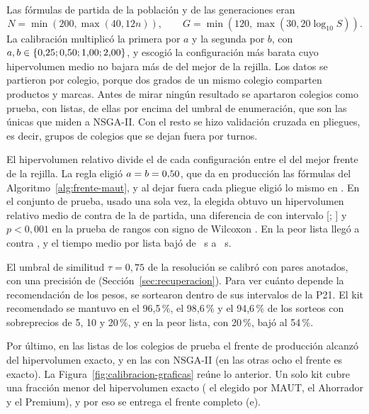 Las fórmulas de partida de la población y de las generaciones eran
\[N=\min(200,\max(40,12n)),\qquad G=\min(120,\max(30,20\log_{10}S)).\] La calibración multiplicó la primera por $a$ y la segunda por
$b$, con $a,b\in\{0{,}25; 0{,}50; 1{,}00; 2{,}00\}$, y escogió la configuración más barata cuyo hipervolumen medio no
bajara más de \calUmbralHV{} del mejor de la rejilla. Los datos se partieron por colegio, porque dos grados
de un mismo colegio comparten productos y marcas. Antes de mirar ningún resultado se apartaron \calColegiosPrueba{} colegios como prueba, con
\calHVListas{} listas, \calPrueba{} de ellas por encima del umbral de enumeración, que son las únicas que
miden a NSGA-II. Con el resto se hizo validación cruzada en \calPliegues{} pliegues, es decir,
\calPliegues{} grupos de colegios que se dejan fuera por turnos.

El hipervolumen relativo divide el de cada configuración entre el del mejor frente de la rejilla. La regla eligió $a=b=0{,}50$,
que da en producción las fórmulas del Algoritmo~\ref{alg:frente-maut}, y al dejar fuera cada pliegue
eligió lo mismo en \calPlieguesIguales. En el conjunto de prueba, usado una sola vez, la elegida
obtuvo un hipervolumen relativo medio de \calPruebaElegidaHV{} contra \calPruebaActualHV{} de la de
partida, una diferencia de \calDifHV{} con intervalo [\calDifHVBajo; \calDifHVAlto]
y $p<0{,}001$ en la prueba de rangos con signo de Wilcoxon \citep{wilcoxon_individual_1945}. En la
peor lista llegó a \calPruebaElegidaHVMin{} contra \calPruebaActualHVMin{}, y el tiempo medio por lista bajó de \calPruebaActualT~s a \calPruebaElegidaT~s.

El umbral de similitud $\tau=0{,}75$ de la resolución se calibró con \calTauPares{} pares anotados, con una
precisión de \calTauP{} (Sección~\ref{sec:recuperacion}). Para ver cuánto depende la recomendación de los pesos, se sortearon dentro de sus intervalos de la
P21. El kit recomendado se mantuvo en el 96,5\,\%, el 98,6\,\% y el 94,6\,\% de los sorteos con
sobreprecios de 5, 10 y 20\,\%, y en la peor lista, con 20\,\%, bajó al 54\,\%.

Por último, en las \calHVListas{} listas de los colegios de prueba el frente de producción alcanzó
\calHVFrente{} del hipervolumen exacto, y \calPruebaElegidaHV{} en las \calHVListasNsga{} con NSGA-II
(en las otras ocho el frente es exacto). La Figura~\ref{fig:calibracion-graficas} reúne lo anterior. Un solo kit cubre una
fracción menor del hipervolumen exacto (\calHVMAUTPesos{} el elegido por MAUT, \calHVAhorrador{} el Ahorrador y
\calHVPremium{} el Premium), y por eso se entrega el frente completo (e).

